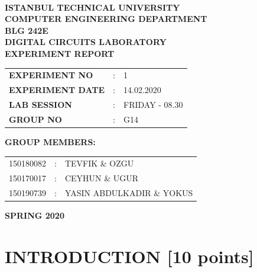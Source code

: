 \documentclass[pdftex,12pt,a4paper]{article}
\begin{document}
\begin{titlepage}
\begin{center}
\textbf{}\\
\textbf{\Large{ISTANBUL TECHNICAL UNIVERSITY}}\\
\vspace{0.5cm}
\textbf{\Large{COMPUTER ENGINEERING DEPARTMENT}}\\
\vspace{2cm}
\textbf{\Large{BLG 242E\\ DIGITAL CIRCUITS LABORATORY\\ EXPERIMENT REPORT}}\\
\vspace{2.8cm}
\begin{table}[ht]
\centering
\Large{
\begin{tabular}{lcl}
\textbf{EXPERIMENT NO}  & : & 1 \\
\textbf{EXPERIMENT DATE}  & : & 14.02.2020 \\
\textbf{LAB SESSION}  & : & FRIDAY - 08.30 \\
\textbf{GROUP NO}  & : & G14 \\
\end{tabular}}
\end{table}
\vspace{1cm}
\textbf{\Large{GROUP MEMBERS:}}\\
\begin{table}[ht]
\centering
\Large{
\begin{tabular}{rcl}
150180082  & : & TEVFIK \& OZGU \\
150170017  & : & CEYHUN \& UGUR \\
150190739  & : & YASIN ABDULKADIR \& YOKUS \\
\end{tabular}}
\end{table}
\vspace{2.8cm}
\textbf{\Large{SPRING 2020}}

\end{center}

\end{titlepage}


\thispagestyle{empty}
\setcounter{tocdepth}{4}
\tableofcontents
\clearpage

\setcounter{page}{1}

\section{INTRODUCTION [10 points]}
\end{document}
